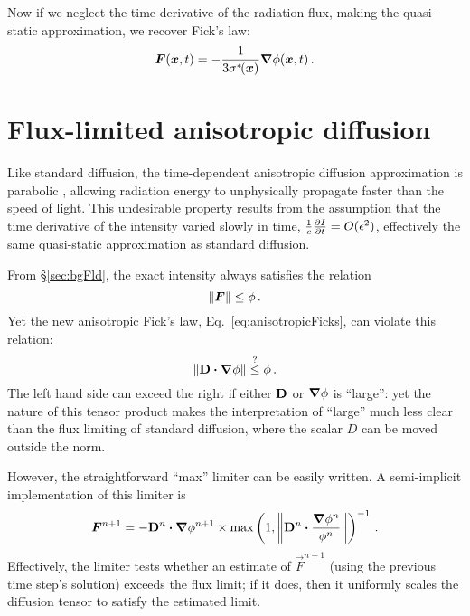 Now if we neglect the time derivative of the radiation flux, making the
quasi-static approximation, we recover Fick's law:
\begin{equation*}
\bm{F}(\bm{x}, t) = -\frac{1}{3\sigma^{*\!}(\bm{x})} \bm{\nabla}\phi(\bm{x}, t) \,.
\end{equation*}

\section{Flux-limited anisotropic diffusion}

Like standard diffusion, the time-dependent anisotropic diffusion approximation
is parabolic \cite{Pom1982,Ols2000}, allowing radiation energy to unphysically
propagate faster than the speed of light.  This undesirable property results
from the assumption that the time derivative of the intensity varied slowly in
time, $\frac{1}{c}\frac{\partial I}{\partial t} = O(\epsilon^2)$, effectively the same
quasi-static approximation as standard diffusion.

From \S\ref{sec:bgFld}, the exact
intensity always satisfies the relation
\begin{equation*}
  \left\| \bm{F} \right\| \le \phi\,.
\end{equation*}
Yet the new anisotropic Fick's law, Eq.~\eqref{eq:anisotropicFicks}, can violate
this relation:
\begin{equation*}
  \left\| \mathbf{D} \bm{\cdot} \bm{\nabla} \phi \right\| \stackrel{?}{\le} \phi \,.
\end{equation*}
The left hand side can exceed the right if either $\mathbf{D}$ or $\bm{\nabla} \phi$ is
``large'':  yet the nature of this tensor product makes the interpretation of
``large'' much less clear than the flux limiting of standard diffusion, where
the scalar $D$ can be moved outside the norm.

However, the straightforward ``max'' limiter can be easily written. A
semi-implicit implementation of this limiter is
\begin{equation*}
  \bm{F}^{n+1} = -\mathbf{D}^{n}\bm{\cdot} \bm{\nabla} \phi^{n+1} \times 
  \max\left( 1, \left\| \mathbf{D}^{n}\bm{\cdot} \frac{\bm{\nabla} \phi^{n}}{\phi^{n}} \right\|
  \right)^{-1} \,.
\end{equation*}
Effectively, the limiter tests whether an estimate of $\vec{F}^{n+1}$ (using the
previous time step's solution) exceeds the flux limit; if it does, then it
uniformly scales the diffusion tensor to satisfy the estimated limit.

